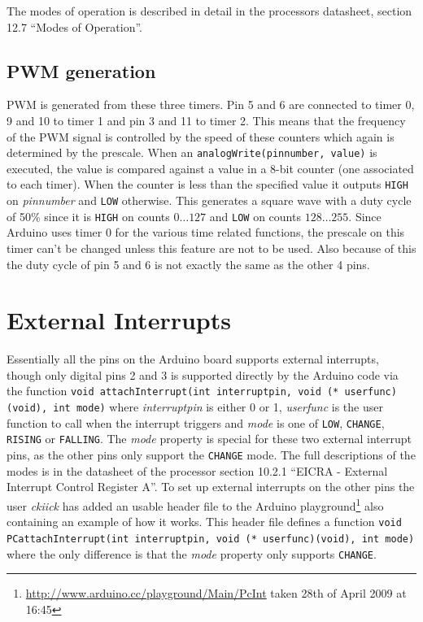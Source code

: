 \documentclass[a4paper, oneside, final]{memoir}
\begin{document}
The modes of operation is described in detail in the processors
datasheet, section 12.7 ``Modes of Operation''.

\subsection{PWM generation}

PWM is generated from these three timers. Pin 5 and 6 are connected to
timer 0, 9 and 10 to timer 1 and pin 3 and 11 to timer 2. This means
that the frequency of the PWM signal is controlled by the speed of
these counters which again is determined by the prescale. When an
\texttt{analogWrite(pinnumber, value)} is executed, the value is
compared against a value in a 8-bit counter (one associated to each
timer). When the counter is less than the specified value it outputs
\texttt{HIGH} on \textit{pinnumber} and \texttt{LOW} otherwise. This
generates a square wave with a duty cycle of 50\% since it is
\texttt{HIGH} on counts $0 \ldots 127$ and \texttt{LOW} on counts $128
\ldots 255$. Since Arduino uses timer 0 for the various time related
functions, the prescale on this timer can't be changed unless this
feature are not to be used. Also because of this the duty cycle of pin
5 and 6 is not exactly the same as the other 4 pins.


\section{External Interrupts}
\label{sec:external-interrupts}

Essentially all the pins on the Arduino board supports external
interrupts, though only digital pins 2 and 3 is supported directly by
the Arduino code via the function \texttt{void attachInterrupt(int
  interruptpin, void (* userfunc)(void), int mode)} where
\textit{interruptpin} is either 0 or 1, \textit{userfunc} is the user
function to call when the interrupt triggers and \textit{mode} is one
of \texttt{LOW}, \texttt{CHANGE}, \texttt{RISING} or
\texttt{FALLING}. The \textit{mode} property is special for these two
external interrupt pins, as the other pins only support the
\texttt{CHANGE} mode. The full descriptions of the modes is in the
datasheet of the processor section 10.2.1 ``EICRA - External Interrupt
Control Register A''. To set up external interrupts on the other pins
the user \textit{ckiick} has added an usable header file to the Arduino
playground\footnote{\url{http://www.arduino.cc/playground/Main/PcInt}
  taken 28th of April 2009 at 16:45} also containing an
example of how it works. This header file defines a function
\texttt{void PCattachInterrupt(int interruptpin, void (*
  userfunc)(void), int mode)} where the only difference is that the
\textit{mode} property only supports \texttt{CHANGE}.
\end{document}
